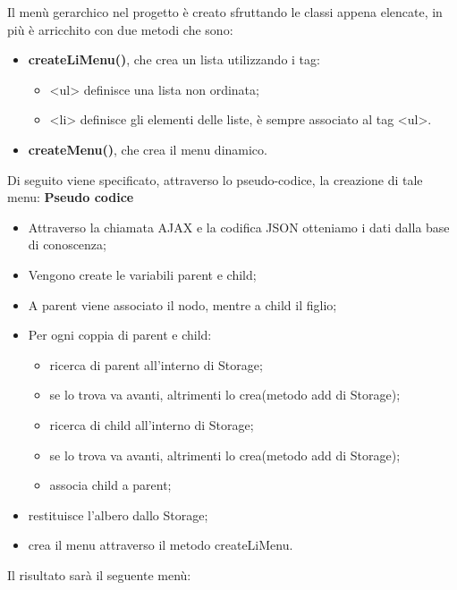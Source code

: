 \documentclass[a4paper,11pt]{article}
\begin{document}
Il menù gerarchico nel progetto è creato sfruttando le classi appena elencate, in più è arricchito con due metodi che sono:
\begin{itemize}
	\item \textbf{createLiMenu()}, che crea un lista utilizzando i tag:
	\begin{itemize}
		\item <ul> definisce una lista non ordinata;
		\item <li> definisce gli elementi delle liste, è sempre associato al tag <ul>.
	\end{itemize}
	\item \textbf{createMenu()}, che crea il menu dinamico.
\end{itemize}
Di seguito viene specificato, attraverso lo pseudo-codice, la creazione di tale menu:\newline
\textbf{Pseudo codice}
	\begin{itemize}
	\item Attraverso la chiamata AJAX e la codifica JSON otteniamo i dati dalla base di conoscenza;
	\item Vengono create le variabili parent e child;
	\item A parent viene associato il nodo, mentre a child il figlio;
	\item Per ogni coppia di parent e child:
		\begin{itemize}
		\item ricerca di parent all'interno di Storage; 
		\item se lo trova va avanti, altrimenti lo crea(metodo add di Storage);
		\item ricerca di child all'interno di Storage;
		\item se lo trova va avanti, altrimenti lo crea(metodo add di Storage);
		\item associa child a parent;
		
		\end{itemize}		
	\item restituisce l'albero dallo Storage;
	\item crea il menu attraverso il metodo createLiMenu.
	\end{itemize} 	
Il risultato sarà il seguente menù:
\end{document}
